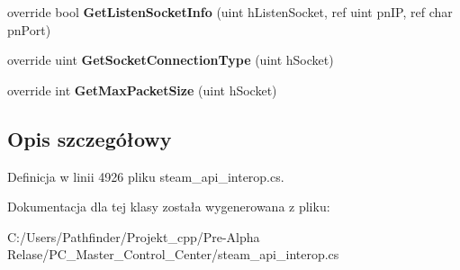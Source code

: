 \begin{DoxyCompactItemize}
\item 
\mbox{\label{class_valve_1_1_steamworks_1_1_c_steam_networking_abb6d09fde81d279e96bd4f5c66d0ad1d}} 
override bool {\bfseries Get\+Listen\+Socket\+Info} (uint h\+Listen\+Socket, ref uint pn\+IP, ref char pn\+Port)
\item 
\mbox{\label{class_valve_1_1_steamworks_1_1_c_steam_networking_a2cf225518e4f277c9b55dccfb4395b49}} 
override uint {\bfseries Get\+Socket\+Connection\+Type} (uint h\+Socket)
\item 
\mbox{\label{class_valve_1_1_steamworks_1_1_c_steam_networking_a250b2b1a778fe8920b1155fd8282c604}} 
override int {\bfseries Get\+Max\+Packet\+Size} (uint h\+Socket)
\end{DoxyCompactItemize}


\subsection{Opis szczegółowy}


Definicja w linii 4926 pliku steam\+\_\+api\+\_\+interop.\+cs.



Dokumentacja dla tej klasy została wygenerowana z pliku\+:\begin{DoxyCompactItemize}
\item 
C\+:/\+Users/\+Pathfinder/\+Projekt\+\_\+cpp/\+Pre-\/\+Alpha Relase/\+P\+C\+\_\+\+Master\+\_\+\+Control\+\_\+\+Center/steam\+\_\+api\+\_\+interop.\+cs\end{DoxyCompactItemize}
